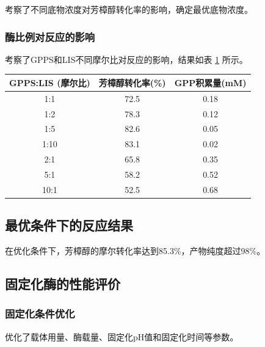 
考察了不同底物浓度对芳樟醇转化率的影响，确定最优底物浓度。

\subsubsection{酶比例对反应的影响}


考察了GPPS和LIS不同摩尔比对反应的影响，结果如表 \ref{tab:enzyme_ratio} 所示。

\begin{table}[h]
  \centering
  \label{tab:enzyme_ratio}
  \begin{tabular}{ccc}
    \toprule
    \textbf{GPPS:LIS (摩尔比)} & \textbf{芳樟醇转化率(\%)} & \textbf{GPP积累量(mM)} \\
    \midrule
    1:1 & 72.5 & 0.18 \\
    1:2 & 78.3 & 0.12 \\
    1:5 & 82.6 & 0.05 \\
    1:10 & 83.1 & 0.02 \\
    2:1 & 65.8 & 0.35 \\
    5:1 & 58.2 & 0.52 \\
    10:1 & 52.5 & 0.68 \\
    \bottomrule
  \end{tabular}
\end{table}

\subsection{最优条件下的反应结果}


在优化条件下，芳樟醇的摩尔转化率达到85.3\%，产物纯度超过98\%。

\subsection{固定化酶的性能评价}

\subsubsection{固定化条件优化}


优化了载体用量、酶载量、固定化pH值和固定化时间等参数。

